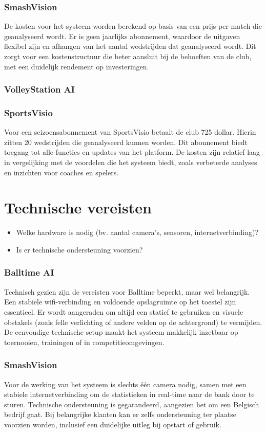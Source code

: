 \subsubsection{SmashVision}
De kosten voor het systeem worden berekend op basis van een prijs per match die geanalyseerd wordt. Er is geen jaarlijks abonnement, waardoor de uitgaven flexibel zijn en afhangen van het aantal wedstrijden dat geanalyseerd wordt. Dit zorgt voor een kostenstructuur die beter aansluit bij de behoeften van de club, met een duidelijk rendement op investeringen.
\subsubsection{VolleyStation AI}

\subsubsection{SportsVisio}
Voor een seizoensabonnement van SportsVisio betaalt de club 725 dollar. Hierin zitten 20 wedstrijden die geanalyseerd kunnen worden. Dit abonnement biedt toegang tot alle functies en updates van het platform. De kosten zijn relatief laag in vergelijking met de voordelen die het systeem biedt, zoals verbeterde analyses en inzichten voor coaches en spelers.

\section{Technische vereisten}
\begin{itemize}
  \item Welke hardware is nodig (bv. aantal camera’s, sensoren, internetverbinding)?
  \item Is er technische ondersteuning voorzien?
\end{itemize}
\subsubsection{Balltime AI}
Technisch gezien zijn de vereisten voor Balltime beperkt, maar wel belangrijk. Een stabiele wifi-verbinding en voldoende opslagruimte op het toestel zijn essentieel. Er wordt aangeraden om altijd een statief te gebruiken en visuele obstakels (zoals felle verlichting of andere velden op de achtergrond) te vermijden. De eenvoudige technische setup maakt het systeem makkelijk inzetbaar op toernooien, trainingen of in competitieomgevingen.
\subsubsection{SmashVision}
Voor de werking van het systeem is slechts één camera nodig, samen met een stabiele internetverbinding om de statistieken in real-time naar de bank door te sturen. Technische ondersteuning is gegarandeerd, aangezien het om een Belgisch bedrijf gaat. Bij belangrijke klanten kan er zelfs ondersteuning ter plaatse voorzien worden, inclusief een duidelijke uitleg bij opstart of gebruik.
